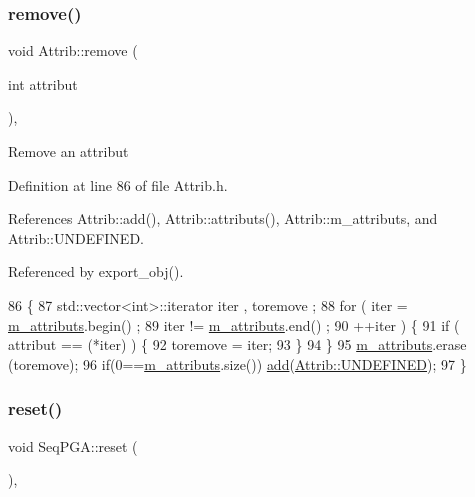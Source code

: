 \subsubsection{\texorpdfstring{remove()}{remove()}}
{\footnotesize\ttfamily void Attrib\+::remove (\begin{DoxyParamCaption}\item[{int}]{attribut }\end{DoxyParamCaption})\hspace{0.3cm}{\ttfamily [inline]}, {\ttfamily [inherited]}}

Remove an attribut 

Definition at line 86 of file Attrib.\+h.



References Attrib\+::add(), Attrib\+::attributs(), Attrib\+::m\+\_\+attributs, and Attrib\+::\+U\+N\+D\+E\+F\+I\+N\+ED.



Referenced by export\+\_\+obj().


\begin{DoxyCode}
86                                \{
87     std::vector<int>::iterator iter , toremove ;
88     \textcolor{keywordflow}{for} ( iter  = \hyperlink{classAttrib_ac4bd58a0cc6b38a3b711d609a3d3aacc}{m\_attributs}.begin() ;
89           iter != \hyperlink{classAttrib_ac4bd58a0cc6b38a3b711d609a3d3aacc}{m\_attributs}.end()   ;
90           ++iter ) \{
91       \textcolor{keywordflow}{if} ( attribut == (*iter) ) \{
92         toremove = iter;
93       \}
94     \}
95     \hyperlink{classAttrib_ac4bd58a0cc6b38a3b711d609a3d3aacc}{m\_attributs}.erase (toremove);
96     \textcolor{keywordflow}{if}(0==\hyperlink{classAttrib_ac4bd58a0cc6b38a3b711d609a3d3aacc}{m\_attributs}.size()) \hyperlink{classAttrib_a235f773af19c900264a190b00a3b4ad7}{add}(\hyperlink{classAttrib_a69e171d7cc6417835a5a306d3c764235a3a8da2ab97dda18aebab196fe4100531}{Attrib::UNDEFINED});
97   \}
\end{DoxyCode}
\mbox{\label{classSeqPGA_aaadcbdd7ad7c96d2d69549b820da6809}} 
\subsubsection{\texorpdfstring{reset()}{reset()}}
{\footnotesize\ttfamily void Seq\+P\+G\+A\+::reset (\begin{DoxyParamCaption}{ }\end{DoxyParamCaption})\hspace{0.3cm}{\ttfamily [inline]}, {\ttfamily [virtual]}}

